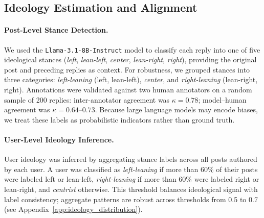 \documentclass[letterpaper]{article} %
\newcommand{\cb}[1]{\textcolor{blue}{CB: #1}}
\begin{document}
\subsection{Ideology Estimation and Alignment}

\paragraph*{Post-Level Stance Detection.}
We used the \texttt{Llama-3.1-8B-Instruct} model to classify each reply into one of five ideological stances (\textit{left}, \textit{lean-left}, \textit{center}, \textit{lean-right}, \textit{right}), providing the original post and preceding replies as context. For robustness, we grouped stances into three categories: \textit{left-leaning} (left, lean-left), \textit{center}, and \textit{right-leaning} (lean-right, right). Annotations were validated against two human annotators on a random sample of 200 replies: inter-annotator agreement was $\kappa = 0.78$; model--human agreement was $\kappa = 0.64$--$0.73$. Because large language models may encode biases, we treat these labels as probabilistic indicators rather than ground truth.

\paragraph*{User-Level Ideology Inference.}
User ideology was inferred by aggregating stance labels across all posts authored by each user. A user was classified as \textit{left-leaning} if more than 60\% of their posts were labeled left or lean-left, \textit{right-leaning} if more than 60\% were labeled right or lean-right, and \textit{centrist} otherwise. This threshold balances ideological signal with label consistency; aggregate patterns are robust across thresholds from 0.5 to 0.7 (see Appendix~\ref{app:ideology_distribution}). 

\end{document}
